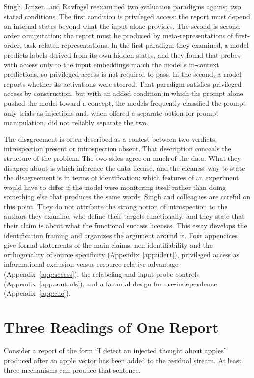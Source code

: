 \documentclass[11pt]{article}
\theoremstyle{definition}
\theoremstyle{remark}
\begin{document}
Singh, Linzen, and Ravfogel \citeyearpar{singh2026} reexamined two evaluation paradigms against two stated conditions. The first condition is privileged access: the report must depend on internal states beyond what the input alone provides. The second is second-order computation: the report must be produced by meta-representations of first-order, task-related representations. In the first paradigm they examined, a model predicts labels derived from its own hidden states, and they found that probes with access only to the input embeddings match the model's in-context predictions, so privileged access is not required to pass. In the second, a model reports whether its activations were steered. That paradigm satisfies privileged access by construction, but with an added condition in which the prompt alone pushed the model toward a concept, the models frequently classified the prompt-only trials as injections and, when offered a separate option for prompt manipulation, did not reliably separate the two.

The disagreement is often described as a contest between two verdicts, introspection present or introspection absent. That description conceals the structure of the problem. The two sides agree on much of the data. What they disagree about is which inference the data license, and the cleanest way to state the disagreement is in terms of identification: which features of an experiment would have to differ if the model were monitoring itself rather than doing something else that produces the same words. Singh and colleagues are careful on this point. They do not attribute the strong notion of introspection to the authors they examine, who define their targets functionally, and they state that their claim is about what the functional success licenses. This essay develops the identification framing and organizes the argument around it. Four appendices give formal statements of the main claims: non-identifiability and the orthogonality of source specificity (Appendix~\ref{app:ident}), privileged access as informational exclusion versus resource-relative advantage (Appendix~\ref{app:access}), the relabeling and input-probe controls (Appendix~\ref{app:controls}), and a factorial design for cue-independence (Appendix~\ref{app:cue}).

\section{Three Readings of One Report}

Consider a report of the form ``I detect an injected thought about apples'' produced after an apple vector has been added to the residual stream. At least three mechanisms can produce that sentence.
\end{document}
